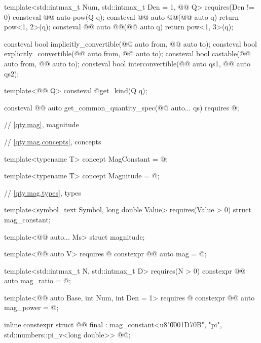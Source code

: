 \begin{codeblock}
{template<std::intmax_t Num, std::intmax_t Den = 1, @@ Q>
  requires(Den != 0)
consteval @@ auto pow(Q q);
consteval @@ auto @@(@@ auto q) { return pow<1, 2>(q); }
consteval @@ auto @@(@@ auto q) { return pow<1, 3>(q); }

consteval bool implicitly_convertible(@@ auto from, @@ auto to);
consteval bool explicitly_convertible(@@ auto from, @@ auto to);
consteval bool castable(@@ auto from, @@ auto to);
consteval bool interconvertible(@@ auto qs1, @@ auto qs2);

template<@@ Q>
consteval @\seebelownc@ get_kind(Q q);

consteval @@ auto get_common_quantity_spec(@@ auto... qs)
  requires @\seebelownc@;

// \ref{qty.mag}, magnitude

// \ref{qty.mag.concepts}, concepts

template<typename T>
concept MagConstant = @\seebelownc@;

template<typename T>
concept Magnitude = @\seebelownc@;

// \ref{qty.mag.types}, types

template<symbol_text Symbol, long double Value>
  requires(Value > 0)
struct mag_constant;

template<@@ auto... Ms>
struct magnitude;

template<@@ auto V>
  requires @\seebelownc@
constexpr @@ auto mag = @\seebelownc@;

template<std::intmax_t N, std::intmax_t D>
  requires(N > 0)
constexpr @@ auto mag_ratio = @\seebelownc@;

template<@@ auto Base, int Num, int Den = 1>
  requires @\seebelownc@
constexpr @@ auto mag_power = @\seebelownc@;

inline constexpr struct @@ final :
    mag_constant<{u8"\U0001D70B", "pi"}, std::numbers::pi_v<long double>> {
} @@;

}
\end{codeblock}

